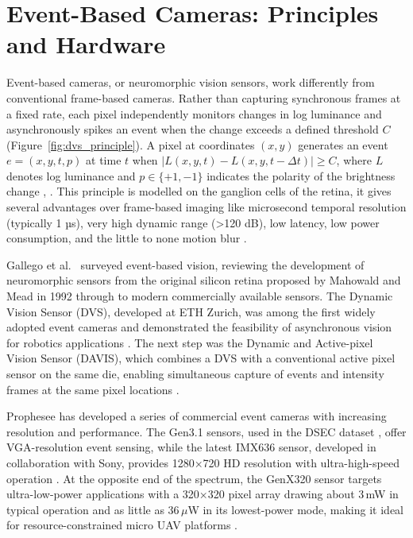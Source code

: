 \documentclass[11pt, a4paper]{report}
\begin{document}
\section{Event-Based Cameras: Principles and Hardware}
Event-based cameras, or neuromorphic vision sensors, work differently from conventional frame-based cameras. Rather than capturing synchronous frames at a fixed rate, each pixel independently monitors changes in log luminance and asynchronously spikes an event when the change exceeds a defined threshold $C$ (Figure~\ref{fig:dvs_principle}). A pixel at coordinates $(x, y)$ generates an event $e = (x, y, t, p)$ at time $t$ when $|L(x, y, t) - L(x, y, t - \Delta t)| \geq C$, where $L$ denotes log luminance and $p \in \{+1, -1\}$ indicates the polarity of the brightness change \cite{gallego2020event}, \cite{lichtsteiner2008128x128}. This principle is modelled on the ganglion cells of the retina, it gives several advantages over frame-based imaging like microsecond temporal resolution (typically 1 µs), very high dynamic range (>120 dB), low latency, low power consumption, and the little to none motion blur \cite{gallego2020event}.

Gallego et al.~\cite{gallego2020event} surveyed event-based vision, reviewing the development of neuromorphic sensors from the original silicon retina proposed by Mahowald and Mead in 1992 through to modern commercially available sensors. The Dynamic Vision Sensor (DVS), developed at ETH Zurich, was among the first widely adopted event cameras and demonstrated the feasibility of asynchronous vision for robotics applications \cite{lichtsteiner2008128x128}. The next step was the Dynamic and Active-pixel Vision Sensor (DAVIS), which combines a DVS with a conventional active pixel sensor on the same die, enabling simultaneous capture of events and intensity frames at the same pixel locations \cite{brandli2014240x180}.

Prophesee has developed a series of commercial event cameras with increasing resolution and performance. The Gen3.1 sensors, used in the DSEC dataset \cite{gehrig2021dsec}, offer VGA-resolution event sensing, while the latest IMX636 sensor, developed in collaboration with Sony, provides 1280×720 HD resolution with ultra-high-speed operation \cite{prophesee2026metavision}. At the opposite end of the spectrum, the GenX320 sensor targets ultra-low-power applications with a 320×320 pixel array drawing about 3\,mW in typical operation and as little as 36\,$\mu$W in its lowest-power mode, making it ideal for resource-constrained micro UAV platforms \cite{prophesee2025genx320}.
\end{document}
